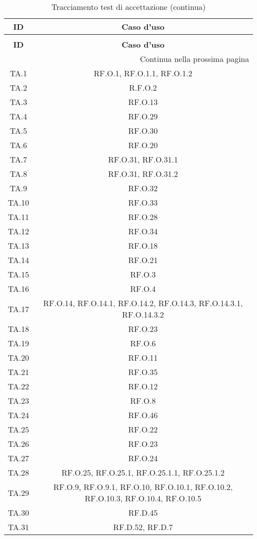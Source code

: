 \bgroup
\begin{adjustwidth}{-0.5cm}{-0.5cm}
	\centering
  \begin{longtable}{|c|c|}
		\caption{Tracciamento test di accettazione}
  	\label{tab:tracciamento-test-accettazione} \\
    \hline
		\textbf{ID} & \textbf{Caso d'uso} \\ 
		\hline
		\endfirsthead

		\caption[]{Tracciamento test di accettazione (continua)} \\
		\hline
		\textbf{ID} & \textbf{Caso d'uso} \\ 
		\hline
		\endhead

		\hline
		\multicolumn{2}{|r|}{{Continua nella prossima pagina}} \\ 
		\hline
		\endfoot

		\hline
		\endlastfoot

    TA.1 & RF.O.1, RF.O.1.1, RF.O.1.2\\
		\hline TA.2 & R.F.O.2\\
		\hline TA.3 & RF.O.13\\
		\hline TA.4 & RF.O.29\\
		\hline TA.5 & RF.O.30\\
		\hline TA.6 & RF.O.20\\
		\hline TA.7 & RF.O.31, RF.O.31.1\\
		\hline TA.8 & RF.O.31, RF.O.31.2\\
		\hline TA.9 & RF.O.32\\
		\hline TA.10 & RF.O.33\\
		\hline TA.11 & RF.O.28\\
		\hline TA.12 & RF.O.34\\
		\hline TA.13 & RF.O.18\\
		\hline TA.14 & RF.O.21\\
		\hline TA.15 & RF.O.3\\
		\hline TA.16 & RF.O.4\\
		\hline TA.17 & RF.O.14, RF.O.14.1, RF.O.14.2, RF.O.14.3, RF.O.14.3.1, RF.O.14.3.2\\
		\hline TA.18 & RF.O.23\\
		\hline TA.19 & RF.O.6\\
		\hline TA.20 & RF.O.11\\
		\hline TA.21 & RF.O.35\\
		\hline TA.22 & RF.O.12\\
		\hline TA.23 & RF.O.8\\
		\hline TA.24 & RF.O.46\\
		\hline TA.25 & RF.O.22\\
		\hline TA.26 & RF.O.23\\
		\hline TA.27 & RF.O.24\\
		\hline TA.28 & RF.O.25, RF.O.25.1, RF.O.25.1.1, RF.O.25.1.2\\
		\hline TA.29 & RF.O.9, RF.O.9.1, RF.O.10, RF.O.10.1, RF.O.10.2, RF.O.10.3, RF.O.10.4, RF.O.10.5\\
		\hline TA.30 & RF.D.45\\
		\hline TA.31 & RF.D.52, RF.D.7\\
  \end{longtable}
\end{adjustwidth}
\egroup